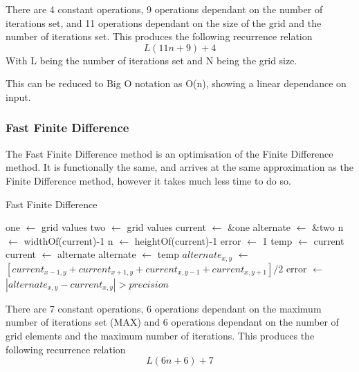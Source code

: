 \documentclass[aps,twocolumn,pre,nofootinbib,10pt]{revtex4-1}
\newcommand*\Let[2]{\State #1 $\gets$ #2}
\begin{document}
There are 4 constant operations, 9 operations dependant on the number of iterations set, and 11 operations dependant on the size of the grid and the number of iterations set. This produces the following recurrence relation \[L(11n+9)+4\] With L being the number of iterations set and N being the grid size.

This can be reduced to Big O notation as O(n), showing a linear dependance on input.

\subsubsection{Fast Finite Difference}

The Fast Finite Difference method is an optimisation of the Finite Difference method. It is functionally the same, and arrives at the same approximation as the Finite Difference method, however it takes much less time to do so.

\begin{algorithm}
    \caption{Fast Finite Difference}
    \label{alg:ffd}
    \begin{algorithmic}[1]
            \Let{one}{grid values}
            \Let{two}{grid values}
            \Let{*current}{\&one}
            \Let{*alternate}{\&two}
            \Let{n}{widthOf(current)-1}
            \Let{n}{heightOf(current)-1}
                \Let{error}{1}
                \Let{temp}{current}
                \Let{current}{alternate}
                \Let{alternate}{temp}
                            \Let{$alternate_{x,y}$}{$[{current_{x-1,y}+current_{x+1,y}+current_{x,y-1}+current_{x,y+1}}] / {2}$}
                                \Let{error}{$|alternate_{x,y} - current_{x,y}| > precision$}
                            \EndIf
                        \EndIf
                    \EndFor
                \EndFor
            \EndFor
        \EndFunction
    \end{algorithmic}
\end{algorithm}

There are 7 constant operations, 6 operations dependant on the maximum number of iterations set (MAX) and 6 operations dependant on the number of grid elements and the maximum number of iterations. This produces the following recurrence relation \[L(6n + 6) + 7\]
\end{document}
